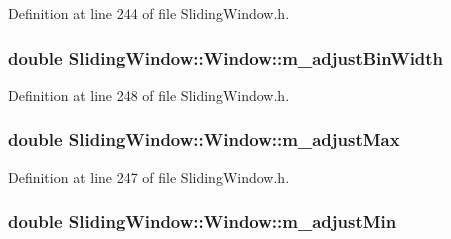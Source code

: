 Definition at line 244 of file Sliding\+Window.\+h.

\subsubsection[{\texorpdfstring{m\+\_\+adjust\+Bin\+Width}{m_adjustBinWidth}}]{\setlength{\rightskip}{0pt plus 5cm}double Sliding\+Window\+::\+Window\+::m\+\_\+adjust\+Bin\+Width\hspace{0.3cm}{\ttfamily [protected]}}\hypertarget{classSlidingWindow_1_1Window_aa1ae0483bbbcdb0334d3356f279ef2b7}{}\label{classSlidingWindow_1_1Window_aa1ae0483bbbcdb0334d3356f279ef2b7}


Definition at line 248 of file Sliding\+Window.\+h.

\subsubsection[{\texorpdfstring{m\+\_\+adjust\+Max}{m_adjustMax}}]{\setlength{\rightskip}{0pt plus 5cm}double Sliding\+Window\+::\+Window\+::m\+\_\+adjust\+Max\hspace{0.3cm}{\ttfamily [protected]}}\hypertarget{classSlidingWindow_1_1Window_aeb0cb796c71f6fc4029a03ce839fe759}{}\label{classSlidingWindow_1_1Window_aeb0cb796c71f6fc4029a03ce839fe759}


Definition at line 247 of file Sliding\+Window.\+h.

\subsubsection[{\texorpdfstring{m\+\_\+adjust\+Min}{m_adjustMin}}]{\setlength{\rightskip}{0pt plus 5cm}double Sliding\+Window\+::\+Window\+::m\+\_\+adjust\+Min\hspace{0.3cm}{\ttfamily [protected]}}\hypertarget{classSlidingWindow_1_1Window_ae0d29d89f73402d85c3bac1cc295d4c4}{}\label{classSlidingWindow_1_1Window_ae0d29d89f73402d85c3bac1cc295d4c4}



